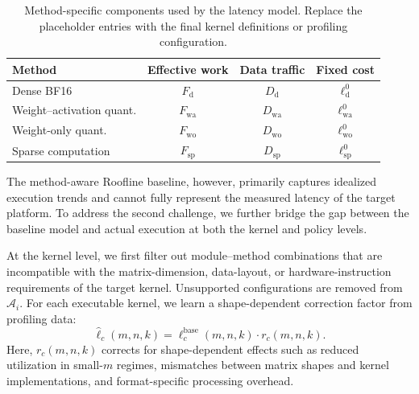\documentclass[letterpaper]{article} %
\begin{document}
\begin{table}[t]
    \centering
    \small
    \caption{Method-specific components used by the latency model. Replace the placeholder entries with the final kernel definitions or profiling configuration.}
    \label{tab:latency-placeholder}
    \setlength{\tabcolsep}{3.5pt}
    \begin{tabular}{lccc}
        \toprule
        Method & Effective work & Data traffic & Fixed cost \\
        \midrule
        Dense BF16       & $F_{\mathrm{d}}$  & $D_{\mathrm{d}}$  & $\ell_{\mathrm{d}}^{0}$ \\
        Weight--activation quant. & $F_{\mathrm{wa}}$ & $D_{\mathrm{wa}}$ & $\ell_{\mathrm{wa}}^{0}$ \\
        Weight-only quant.       & $F_{\mathrm{wo}}$ & $D_{\mathrm{wo}}$ & $\ell_{\mathrm{wo}}^{0}$ \\
        Sparse computation      & $F_{\mathrm{sp}}$ & $D_{\mathrm{sp}}$ & $\ell_{\mathrm{sp}}^{0}$ \\
        \bottomrule
    \end{tabular}
    \vspace{-6pt}
\end{table}

The method-aware Roofline baseline, however, primarily captures idealized execution trends and cannot fully represent the measured latency of the target platform. To address the second challenge, we further bridge the gap between the baseline model and actual execution at both the kernel and policy levels.

At the kernel level, we first filter out module--method combinations that are incompatible with the matrix-dimension, data-layout, or hardware-instruction requirements of the target kernel. Unsupported configurations are removed from $\mathcal{A}_i$. For each executable kernel, we learn a shape-dependent correction factor from profiling data:
\begin{equation}
\widehat{\ell}_c(m,n,k)
=
\ell_c^{\mathrm{base}}(m,n,k)
\cdot
r_c(m,n,k).
\end{equation}
Here, $r_c(m,n,k)$ corrects for shape-dependent effects such as reduced utilization in small-$m$ regimes, mismatches between matrix shapes and kernel implementations, and format-specific processing overhead.
\end{document}
